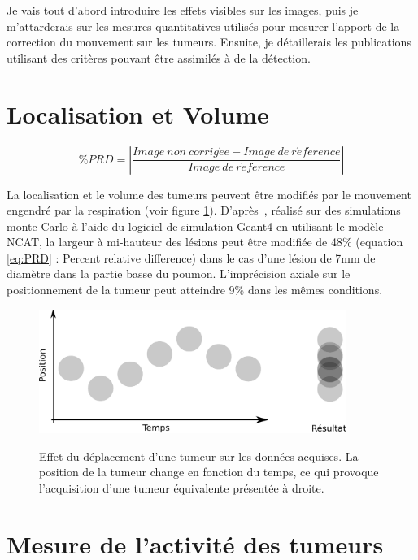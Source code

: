 Je vais tout d'abord introduire les effets visibles sur les images, puis je m'attarderais sur les mesures quantitatives utilisés pour mesurer l'apport de la correction du mouvement sur les tumeurs. Ensuite, je détaillerais les publications utilisant des critères pouvant être assimilés à de la détection.

\section{Localisation et Volume}

\begin{equation}
\%PRD= \left| \frac{Image~non~corrig\acute{e}e - Image~de~r\acute{e}f\acute{e}rence}{Image~de~r\acute{e}f\acute{e}rence} \right|
\label{eq:PRD}
\end{equation}

La localisation et le volume des tumeurs peuvent être modifiés par le mouvement engendré par la respiration (voir figure \ref{fig:effetMvt}). D'après~\cite{lamare2007respiratory}, réalisé sur des simulations monte-Carlo à l'aide du logiciel de simulation Geant4\cite{jan2004gate} en utilisant le modèle NCAT\cite{segars2001These}, la largeur à mi-hauteur des lésions peut être modifiée de 48\% (equation \ref{eq:PRD} : Percent relative difference) dans le cas d'une lésion de 7mm de diamètre dans la partie basse du poumon. L'imprécision axiale sur le positionnement de la tumeur peut atteindre 9\% dans les mêmes conditions.

\begin{figure}[h!]
    \begin{center}
            \includegraphics[width=10cm]{images/moyennageImage} \\
    \end{center}
    \caption{Effet du déplacement d'une tumeur sur les données acquises. La position de la tumeur change en fonction du temps, ce qui provoque l'acquisition d'une tumeur équivalente présentée à droite.}
    \label{fig:effetMvt}
\end{figure}


\section{Mesure de l'activité des tumeurs}

